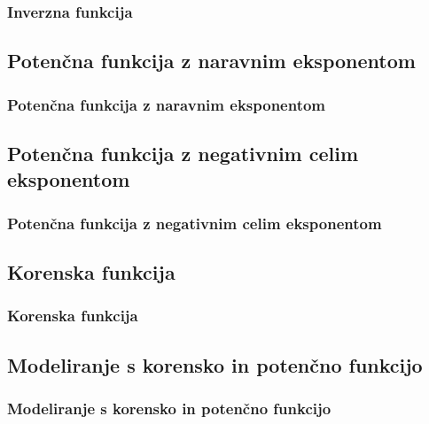         \begin{frame}
            \frametitle{Inverzna funkcija}
        \end{frame}

    \subsection{Potenčna funkcija z naravnim eksponentom}

        \begin{frame}
            \frametitle{Potenčna funkcija z naravnim eksponentom}
        \end{frame}

    \subsection{Potenčna funkcija z negativnim celim eksponentom}

        \begin{frame}
            \frametitle{Potenčna funkcija z negativnim celim eksponentom}
        \end{frame}

    \subsection{Korenska funkcija}

        \begin{frame}
            \frametitle{Korenska funkcija}
        \end{frame}

    \subsection{Modeliranje s korensko in potenčno funkcijo}

        \begin{frame}
            \frametitle{Modeliranje s korensko in potenčno funkcijo}
        \end{frame}
